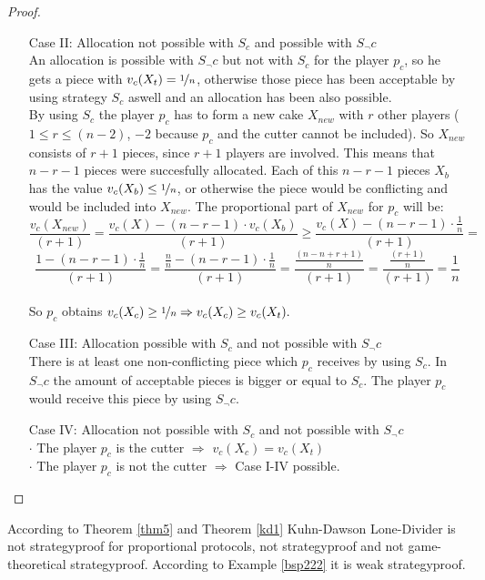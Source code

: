 \begin{proof}
\begin{itemize}
\item[Case] II: Allocation not possible with $S_c$ and possible with $S_\neg c$\\
An allocation is possible with $S_\neg c$ but not with $S_c$ for the player $p_c$, so he gets a piece with $v_c(X_t)=\nicefrac{1}{n}$, otherwise those piece has been acceptable by using strategy $S_c$ aswell and an allocation has been also possible.\\
By using $S_c$ the player $p_c$ has to form a new cake $X_{new}$ with $r$ other players ($1 \leq r \leq (n-2)$, $-2$ because $p_c$ and the cutter cannot be included). So $X_{new}$ consists of $r+1$ pieces, since $r+1$ players are involved. This means that $n-r-1$ pieces were succesfully allocated. Each of this $n-r-1$ pieces $X_b$ has the value $v_c(X_b) \leq \nicefrac{1}{n}$, or otherwise the piece would be conflicting and would be included into $X_{new}$. The proportional part of $X_{new}$ for $p_c$ will be:
$$\frac{v_c(X_{new})}{(r+1)}=\frac{v_c(X)-(n-r-1)\cdot v_c(X_b)}{(r+1)} \geq \frac{v_c(X)-(n-r-1) \cdot \frac{1}{n}}{(r+1)}=$$$$\frac{1-(n-r-1)\cdot \frac{1}{n}}{(r+1)}=\frac{\frac{n}{n}-(n-r-1) \cdot \frac{1}{n}}{(r+1)}=\frac{\frac{(n-n+r+1)}{n}}{(r+1)}=\frac{\frac{(r+1)}{n}}{(r+1)}=\frac{1}{n}$$\\
So $p_c$ obtains $v_c(X_c)\geq \nicefrac{1}{n}\Rightarrow v_c(X_c)\geq v_c(X_t).$ 
\item[Case] III: Allocation possible with $S_c$ and not possible with $S_\neg c$ \blitza\\
There is at least one non-conflicting piece which $p_c$ receives by using $S_c$. In $S_\neg c$ the amount of acceptable pieces is bigger or equal to $S_c$. The player $p_c$ would receive this piece by using $S_\neg c$.
\item[Case] IV: Allocation not possible with $S_c$ and not possible with $S_\neg c$\\
$\cdot$ The player $p_c$ is the cutter $\Rightarrow$ $v_c(X_c)=v_c(X_t)$\\
$\cdot$ The player $p_c$ is not the cutter $\Rightarrow$ Case I-IV possible.
\end{itemize}
\end{proof}
\begin{bezeichnungen}
According to Theorem \ref{thm5} and Theorem \ref{kd1} Kuhn-Dawson Lone-Divider is not strategyproof for proportional protocols, not strategyproof and not game-theoretical strategyproof. According to Example \ref{bsp222} it is weak strategyproof.
\end{bezeichnungen}
\newpage
